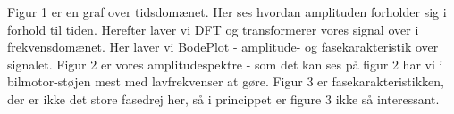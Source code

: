 \documentclass[12pt, letterpaper]{article}
\begin{document}
\begin{figure}[!h]
           \begin{floatrow}
       
           \end{floatrow}
\end{figure}

Figur 1 er en graf over tidsdomænet. Her ses hvordan amplituden forholder sig i forhold til tiden. Herefter laver vi DFT og transformerer vores signal over i frekvensdomænet. Her laver vi BodePlot - amplitude- og fasekarakteristik over signalet. Figur 2 er vores amplitudespektre - som det kan ses på figur 2 har vi i bilmotor-støjen mest med lavfrekvenser at gøre.  
Figur 3 er fasekarakteristikken, der er ikke det store fasedrej her, så i princippet er figure 3 ikke så interessant. 

\newpage
\end{document}
